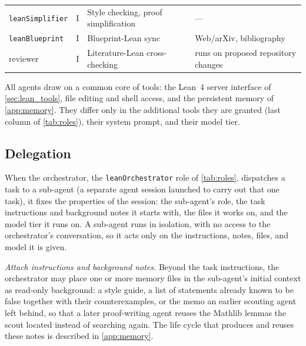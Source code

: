 \begin{table}[htbp]
\begin{tabular}{@{}lcll@{}}
        \texttt{leanSimplifier}   & I      & Style checking, proof simplification                                             & ---                                                                                                             \\
        \texttt{leanBlueprint}    & I      & Blueprint-Lean sync                                                              & Web/arXiv, bibliography                                                                                         \\
        reviewer                  & I      & Literature-Lean cross-checking                                                   & runs on proposed repository changes                                                                             \\
        \bottomrule
    \end{tabular}
\end{table}


All agents draw on a common core of tools: the Lean~4 server interface of \cref{sec:lean_tools}, file editing and shell access, and the persistent memory of \cref{app:memory}. They differ only in the additional tools they are granted (last column of \cref{tab:roles}), their system prompt, and their model tier.

\subsection{Delegation}\label{sec:delegation}

When the orchestrator, the \texttt{leanOrchestrator} role of \cref{tab:roles}, dispatches a task to a sub-agent (a separate agent session launched to carry out that one task), it fixes the properties of the session: the sub-agent's role, the task instructions and background notes it starts with, the files it works on, and the model tier it runs on. A sub-agent runs in isolation, with no access to the orchestrator's conversation, so it acts only on the instructions, notes, files, and model it is given.

\emph{Attach instructions and background notes.} Beyond the task instructions, the orchestrator may place one or more memory files in the sub-agent's initial context as read-only background: a style guide, a list of statements already known to be false together with their counterexamples, or the memo an earlier scouting agent left behind, so that a later proof-writing agent reuses the Mathlib lemmas the scout located instead of searching again. The life cycle that produces and reuses these notes is described in \cref{app:memory}.


